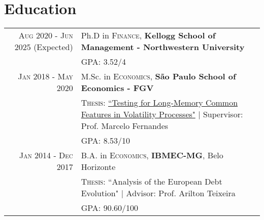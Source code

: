 \documentclass[a4paper,10pt]{article}
\begin{document}
\section{Education}
\begin{tabular}{r|p{8.75cm}}	
    \textsc{Aug} 2020 - \textsc{Jun} 2025 (Expected) & Ph.D in \textsc{Finance}, \normalsize\textbf{Kellogg School of Management - Northwestern University} \\
    &\normalsize \textsc{GPA}: 3.52/4 \\
    \textsc{Jan} 2018 - \textsc{May} 2020 & M.Sc. in \textsc{Economics}, \normalsize\textbf{São Paulo School of Economics - FGV} \\
    & \normalsize \textsc{Thesis}: \href{http://hdl.handle.net/10438/29188}{``Testing for Long-Memory Common Features in Volatility Processes"} | \small Supervisor: Prof. Marcelo Fernandes \\ 
    &\normalsize \textsc{GPA}: 8.53/10
    \\
    \textsc{Jan} 2014 - \textsc{Dec} 2017& B.A. in \textsc{Economics}, \normalsize\textbf{IBMEC-MG}, Belo Horizonte \\
    & \normalsize \textsc{Thesis}: ``Analysis of the European Debt Evolution" | \small Advisor: Prof. Arilton Teixeira \\
    &\normalsize \textsc{GPA}: 90.60/100
\end{tabular}

\end{document}
